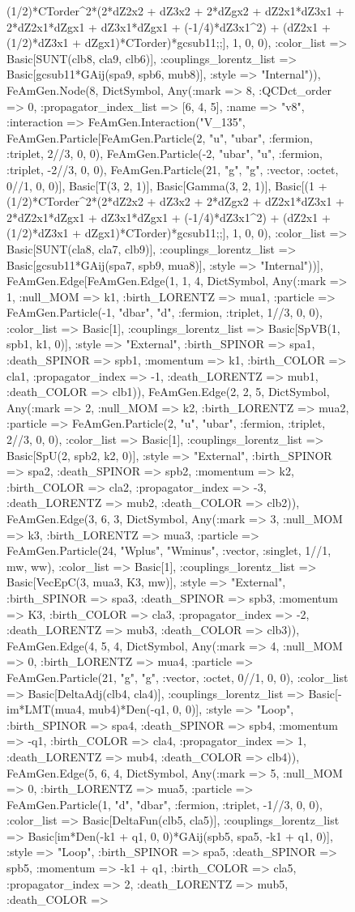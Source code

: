 \documentclass{revtex4}
\begin{document}
\begin{figure}[!htb]
\begin{center}
{(1/2)*CTorder^2*(2*dZ2x2 + dZ3x2 + 2*dZgx2 + dZ2x1*dZ3x1 + 2*dZ2x1*dZgx1 + dZ3x1*dZgx1 + (-1/4)*dZ3x1^2) + (dZ2x1 + (1/2)*dZ3x1 + dZgx1)*CTorder)*gcsub11;;], 1, 0, 0), :color_list => Basic[SUNT(clb8, cla9, clb6)], :couplings_lorentz_list => Basic[gcsub11*GAij(spa9, spb6, mub8)], :style => "Internal")), FeAmGen.Node(8, Dict{Symbol, Any}(:mark => 8, :QCDct_order => 0, :propagator_index_list => [6, 4, 5], :name => "v8", :interaction => FeAmGen.Interaction("V_135", FeAmGen.Particle[FeAmGen.Particle(2, "u", "ubar", :fermion, :triplet, 2//3, 0, 0), FeAmGen.Particle(-2, "ubar", "u", :fermion, :triplet, -2//3, 0, 0), FeAmGen.Particle(21, "g", "g", :vector, :octet, 0//1, 0, 0)], Basic[T(3, 2, 1)], Basic[Gamma(3, 2, 1)], Basic[(1 + (1/2)*CTorder^2*(2*dZ2x2 + dZ3x2 + 2*dZgx2 + dZ2x1*dZ3x1 + 2*dZ2x1*dZgx1 + dZ3x1*dZgx1 + (-1/4)*dZ3x1^2) + (dZ2x1 + (1/2)*dZ3x1 + dZgx1)*CTorder)*gcsub11;;], 1, 0, 0), :color_list => Basic[SUNT(cla8, cla7, clb9)], :couplings_lorentz_list => Basic[gcsub11*GAij(spa7, spb9, mua8)], :style => "Internal"))], FeAmGen.Edge[FeAmGen.Edge(1, 1, 4, Dict{Symbol, Any}(:mark => 1, :null_MOM => k1, :birth_LORENTZ => mua1, :particle => FeAmGen.Particle(-1, "dbar", "d", :fermion, :triplet, 1//3, 0, 0), :color_list => Basic[1], :couplings_lorentz_list => Basic[SpVB(1, spb1, k1, 0)], :style => "External", :birth_SPINOR => spa1, :death_SPINOR => spb1, :momentum => k1, :birth_COLOR => cla1, :propagator_index => -1, :death_LORENTZ => mub1, :death_COLOR => clb1)), FeAmGen.Edge(2, 2, 5, Dict{Symbol, Any}(:mark => 2, :null_MOM => k2, :birth_LORENTZ => mua2, :particle => FeAmGen.Particle(2, "u", "ubar", :fermion, :triplet, 2//3, 0, 0), :color_list => Basic[1], :couplings_lorentz_list => Basic[SpU(2, spb2, k2, 0)], :style => "External", :birth_SPINOR => spa2, :death_SPINOR => spb2, :momentum => k2, :birth_COLOR => cla2, :propagator_index => -3, :death_LORENTZ => mub2, :death_COLOR => clb2)), FeAmGen.Edge(3, 6, 3, Dict{Symbol, Any}(:mark => 3, :null_MOM => k3, :birth_LORENTZ => mua3, :particle => FeAmGen.Particle(24, "Wplus", "Wminus", :vector, :singlet, 1//1, mw, ww), :color_list => Basic[1], :couplings_lorentz_list => Basic[VecEpC(3, mua3, K3, mw)], :style => "External", :birth_SPINOR => spa3, :death_SPINOR => spb3, :momentum => K3, :birth_COLOR => cla3, :propagator_index => -2, :death_LORENTZ => mub3, :death_COLOR => clb3)), FeAmGen.Edge(4, 5, 4, Dict{Symbol, Any}(:mark => 4, :null_MOM => 0, :birth_LORENTZ => mua4, :particle => FeAmGen.Particle(21, "g", "g", :vector, :octet, 0//1, 0, 0), :color_list => Basic[DeltaAdj(clb4, cla4)], :couplings_lorentz_list => Basic[-im*LMT(mua4, mub4)*Den(-q1, 0, 0)], :style => "Loop", :birth_SPINOR => spa4, :death_SPINOR => spb4, :momentum => -q1, :birth_COLOR => cla4, :propagator_index => 1, :death_LORENTZ => mub4, :death_COLOR => clb4)), FeAmGen.Edge(5, 6, 4, Dict{Symbol, Any}(:mark => 5, :null_MOM => 0, :birth_LORENTZ => mua5, :particle => FeAmGen.Particle(1, "d", "dbar", :fermion, :triplet, -1//3, 0, 0), :color_list => Basic[DeltaFun(clb5, cla5)], :couplings_lorentz_list => Basic[im*Den(-k1 + q1, 0, 0)*GAij(spb5, spa5, -k1 + q1, 0)], :style => "Loop", :birth_SPINOR => spa5, :death_SPINOR => spb5, :momentum => -k1 + q1, :birth_COLOR => cla5, :propagator_index => 2, :death_LORENTZ => mub5, :death_COLOR => }
\end{center}
\end{figure}
\end{document}
